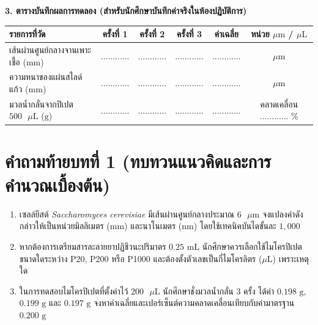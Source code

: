 \begin{labbox}
\noindent\textbf{3. ตารางบันทึกผลการทดลอง (สำหรับนักศึกษาบันทึกค่าจริงในห้องปฏิบัติการ)}
\begin{center}
\footnotesize\setlength{\tabcolsep}{3.5pt}
\begin{tabularx}{\linewidth}{>{\raggedright\arraybackslash}X c c c c c}
\toprule
\textbf{รายการที่วัด} & \textbf{ครั้งที่ 1} & \textbf{ครั้งที่ 2} & \textbf{ครั้งที่ 3} & \textbf{ค่าเฉลี่ย} & \textbf{หน่วย $\mu\text{m}$ / $\mu\text{L}$} \\
\midrule
เส้นผ่านศูนย์กลางจานเพาะเชื้อ ($\text{mm}$) & ............ & ............ & ............ & ............ & \dotfill $\mu\text{m}$ \\
ความหนาของแผ่นสไลด์แก้ว ($\text{mm}$) & ............ & ............ & ............ & ............ & \dotfill $\mu\text{m}$ \\
มวลน้ำกลั่นจากปิเปต $500\text{ }\mu\text{L}$ ($\text{g}$) & ............ & ............ & ............ & ............ & คลาดเคลื่อน ............ \% \\
\bottomrule
\end{tabularx}
\end{center}
\end{labbox}

\section*{คำถามท้ายบทที่ 1 (ทบทวนแนวคิดและการคำนวณเบื้องต้น)}
\begin{enumerate}
    \item เซลล์ยีสต์ \textit{Saccharomyces cerevisiae} มีเส้นผ่านศูนย์กลางประมาณ $6\text{ }\mu\text{m}$ จงแปลงค่าดังกล่าวให้เป็นหน่วยมิลลิเมตร ($\text{mm}$) และนาโนเมตร ($\text{nm}$) โดยใช้เทคนิคบันไดขั้นละ $1{,}000$
    \item หากต้องการเตรียมสารละลายยาปฏิชีวนะปริมาตร $0.25\text{ mL}$ นักศึกษาควรเลือกใช้ไมโครปิเปตขนาดใดระหว่าง P20, P200 หรือ P1000 และต้องตั้งตัวเลขเป็นกี่ไมโครลิตร ($\mu\text{L}$) เพราะเหตุใด
    \item ในการทดสอบไมโครปิเปตที่ตั้งค่าไว้ $200\text{ }\mu\text{L}$ นักศึกษาชั่งมวลน้ำกลั่น 3 ครั้ง ได้ค่า $0.198\text{ g}$, $0.199\text{ g}$ และ $0.197\text{ g}$ จงหาค่าเฉลี่ยและเปอร์เซ็นต์ความคลาดเคลื่อนเทียบกับค่ามาตรฐาน $0.200\text{ g}$
\end{enumerate}
